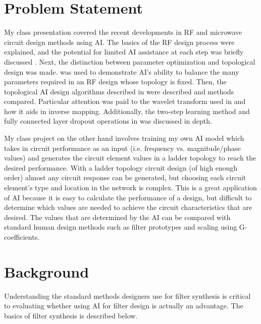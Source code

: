 \documentclass[10pt,conference]{IEEEtran}
\begin{document}
\section{Problem Statement}






My class presentation covered the recent developments in RF and microwave circuit design methods using AI. The basics of the RF design process were explained, and the potential for limited AI assistance at each step was briefly discussed \cite{lee2024icdesign}. Next, the distinction between parameter optimization and topological design was made. \cite{xue2023mmic} was used to demonstrate AI's ability to balance the many parameters required in an RF design whose topology is fixed. Then, the topological AI design algorithms described in \cite{xu2024microwave, karahan2024rfdesign, taskiran2024annsynthesis} were described and methods compared. Particular attention was paid to the wavelet transform used in \cite{xu2024microwave} and how it aids in inverse mapping. Additionally, the two-step learning method and fully connected layer dropout operations in \cite{karahan2024rfdesign} was discussed in depth.

My class project on the other hand involves training my own AI model which takes in circuit performance as an input (i.e. frequency vs. magnitude/phase values) and generates the circuit element values in a ladder topology to reach the desired performance. With a ladder topology circuit design (of high enough order) almost any circuit response can be generated, but choosing each circuit element's type and location in the network is complex. This is a great application of AI because it is easy to calculate the performance of a design, but difficult to determine which values are needed to achieve the circuit characteristics that are desired. The values that are determined by the AI can be compared with standard human design methods such as filter prototypes and scaling using G-coefficients.



\section{Background}

Understanding the standard methods designers use for filter synthesis is critical to evaluating whether using AI for filter design is actually an advantage. The basics of filter synthesis is described below.
\end{document}
